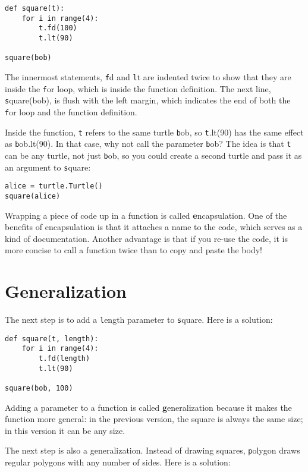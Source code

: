 \documentclass[
DIV=11,
fontsize=13,
twoside,
headinclude=false,
titlepage=firstiscover,
abstract=true,
headsepline=true,
footsepline=true,
chapterprefix=true, %
headings=big,
bibliography=totoc,%
captions=tableheading
]{scrbook}
\theoremstyle{definition}
\begin{document}
\begin{lstlisting}
def square(t):
    for i in range(4):
        t.fd(100)
        t.lt(90)

square(bob)
\end{lstlisting}
%
The innermost statements, {\texttt fd} and {\texttt lt} are indented twice to
show that they are inside the {\texttt for} loop, which is inside the
function definition.  The next line, {\texttt square(bob)}, is flush with
the left margin, which indicates the end of both the {\texttt for} loop
and the function definition.

Inside the function, {\texttt t} refers to the same turtle {\texttt bob}, so
{\texttt t.lt(90)} has the same effect as {\texttt bob.lt(90)}.  In that
case, why not
call the parameter {\texttt bob}?  The idea is that {\texttt t} can be any
turtle, not just {\texttt bob}, so you could create a second turtle and
pass it as an argument to {\texttt square}:

\begin{lstlisting}
alice = turtle.Turtle()
square(alice)
\end{lstlisting}
%
Wrapping a piece of code up in a function is called {\textbf
encapsulation}.  One of the benefits of encapsulation is that it
attaches a name to the code, which serves as a kind of documentation.
Another advantage is that if you re-use the code, it is more concise
to call a function twice than to copy and paste the body!


\section{Generalization}

The next step is to add a {\texttt length} parameter to {\texttt square}.
Here is a solution:

\begin{lstlisting}
def square(t, length):
    for i in range(4):
        t.fd(length)
        t.lt(90)

square(bob, 100)
\end{lstlisting}
%
Adding a parameter to a function is called {\textbf generalization}
because it makes the function more general: in the previous
version, the square is always the same size; in this version
it can be any size.

The next step is also a generalization.  Instead of drawing
squares, {\texttt polygon} draws regular polygons with any number of
sides.  Here is a solution:
\end{document}

